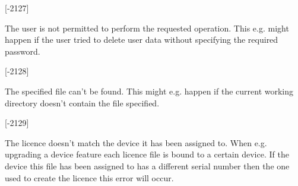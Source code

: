 \begin{Desc}
\begin{description}
{\bfseries }\mbox{[}-\/2127\mbox{]} \item[{\em 
\hypertarget{group___common_interface_gga112225e5fbaaaef6445ff4ebf98f8e03a31849f92983090d8275ce828c798184c}{D\+M\+R\+\_\+\+E\+X\+E\+C\+U\+T\+I\+O\+N\+\_\+\+P\+R\+O\+H\+I\+B\+I\+T\+E\+D}\label{group___common_interface_gga112225e5fbaaaef6445ff4ebf98f8e03a31849f92983090d8275ce828c798184c}
}]The user is not permitted to perform the requested operation. This e.\+g. might happen if the user tried to delete user data without specifying the required password.

{\bfseries }\mbox{[}-\/2128\mbox{]} \item[{\em 
\hypertarget{group___common_interface_gga112225e5fbaaaef6445ff4ebf98f8e03a305c7c3760de1219ba13eb57048b7fcc}{D\+M\+R\+\_\+\+F\+I\+L\+E\+\_\+\+N\+O\+T\+\_\+\+F\+O\+U\+N\+D}\label{group___common_interface_gga112225e5fbaaaef6445ff4ebf98f8e03a305c7c3760de1219ba13eb57048b7fcc}
}]The specified file can't be found. This might e.\+g. happen if the current working directory doesn't contain the file specified.

{\bfseries }\mbox{[}-\/2129\mbox{]} \item[{\em 
\hypertarget{group___common_interface_gga112225e5fbaaaef6445ff4ebf98f8e03a32e3dafe3c55d3d3847ddfa7a4422e0e}{D\+M\+R\+\_\+\+I\+N\+V\+A\+L\+I\+D\+\_\+\+L\+I\+C\+E\+N\+C\+E}\label{group___common_interface_gga112225e5fbaaaef6445ff4ebf98f8e03a32e3dafe3c55d3d3847ddfa7a4422e0e}
}]The licence doesn't match the device it has been assigned to. When e.\+g. upgrading a device feature each licence file is bound to a certain device. If the device this file has been assigned to has a different serial number then the one used to create the licence this error will occur.


\end{description}
\end{Desc}
